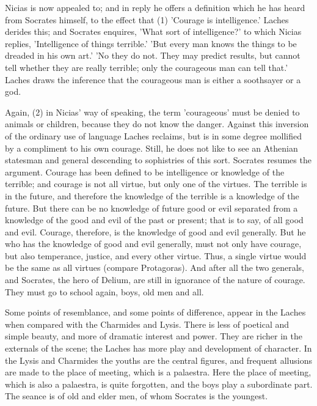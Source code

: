 \documentclass[11pt,letter]{article}
\begin{document}
\par  Nicias is now appealed to; and in reply he offers a definition which he has heard from Socrates himself, to the effect that (1) 'Courage is intelligence.' Laches derides this; and Socrates enquires, 'What sort of intelligence?' to which Nicias replies, 'Intelligence of things terrible.' 'But every man knows the things to be dreaded in his own art.' 'No they do not. They may predict results, but cannot tell whether they are really terrible; only the courageous man can tell that.' Laches draws the inference that the courageous man is either a soothsayer or a god.

\par  Again, (2) in Nicias' way of speaking, the term 'courageous' must be denied to animals or children, because they do not know the danger. Against this inversion of the ordinary use of language Laches reclaims, but is in some degree mollified by a compliment to his own courage. Still, he does not like to see an Athenian statesman and general descending to sophistries of this sort. Socrates resumes the argument. Courage has been defined to be intelligence or knowledge of the terrible; and courage is not all virtue, but only one of the virtues. The terrible is in the future, and therefore the knowledge of the terrible is a knowledge of the future. But there can be no knowledge of future good or evil separated from a knowledge of the good and evil of the past or present; that is to say, of all good and evil. Courage, therefore, is the knowledge of good and evil generally. But he who has the knowledge of good and evil generally, must not only have courage, but also temperance, justice, and every other virtue. Thus, a single virtue would be the same as all virtues (compare Protagoras). And after all the two generals, and Socrates, the hero of Delium, are still in ignorance of the nature of courage. They must go to school again, boys, old men and all.

\par  Some points of resemblance, and some points of difference, appear in the Laches when compared with the Charmides and Lysis. There is less of poetical and simple beauty, and more of dramatic interest and power. They are richer in the externals of the scene; the Laches has more play and development of character. In the Lysis and Charmides the youths are the central figures, and frequent allusions are made to the place of meeting, which is a palaestra. Here the place of meeting, which is also a palaestra, is quite forgotten, and the boys play a subordinate part. The seance is of old and elder men, of whom Socrates is the youngest.
\end{document}
